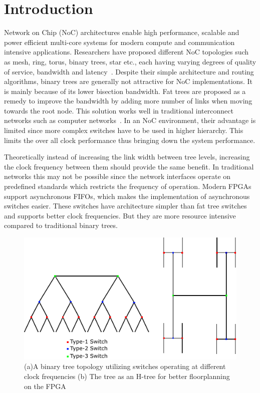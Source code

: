 \section{Introduction}
Network on Chip (NoC) architectures enable high performance, scalable and power efficient multi-core systems for modern compute and communication intensive applications.
Researchers have proposed different NoC topologies such as mesh, ring, torus, binary trees, star etc., each having varying degrees of quality of service, bandwidth and latency~\cite{Dally2003}.
Despite their simple architecture and routing algorithms, binary trees are generally not attractive for NoC implementations.
It is mainly because of its lower bisection bandwidth.
Fat trees are proposed as a remedy to improve the bandwidth by adding more number of links when moving towards the root node.
This solution works well in traditional interconnect networks such as computer networks~\cite{Shainer2011}.
In an NoC environment, their advantage is limited since more complex switches have to be used in higher hierarchy.
This limits the over all clock performance thus bringing down the system performance. 

Theoretically instead of increasing the link width between tree levels, increasing the clock frequency between them should provide the same benefit.
In traditional networks this may not be possible since the network interfaces operate on predefined standards which restricts the frequency of operation.
Modern FPGAs support asynchronous FIFOs, which makes the implementation of asynchronous switches easier.
These switches have architecture simpler than fat tree switches and supports better clock frequencies.
But they are more resource intensive compared to traditional binary trees.


\begin{figure}[t]
\centering
   \includegraphics[width=0.8\columnwidth]{Figures/HNoC.pdf}
   \caption{(a)A binary tree topology utilizing switches operating at different clock frequencies (b) The tree as an H-tree for better floorplanning on the FPGA}
   \label{fig:btree}
   \vspace{-5 mm}
\end{figure}

